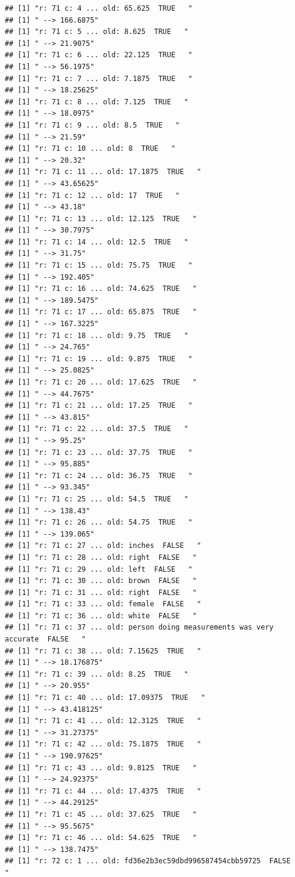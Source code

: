 \documentclass[]{article}
\begin{document}
\begin{verbatim}
## [1] "r: 71 c: 4 ... old: 65.625  TRUE   "
## [1] " --> 166.6875"
## [1] "r: 71 c: 5 ... old: 8.625  TRUE   "
## [1] " --> 21.9075"
## [1] "r: 71 c: 6 ... old: 22.125  TRUE   "
## [1] " --> 56.1975"
## [1] "r: 71 c: 7 ... old: 7.1875  TRUE   "
## [1] " --> 18.25625"
## [1] "r: 71 c: 8 ... old: 7.125  TRUE   "
## [1] " --> 18.0975"
## [1] "r: 71 c: 9 ... old: 8.5  TRUE   "
## [1] " --> 21.59"
## [1] "r: 71 c: 10 ... old: 8  TRUE   "
## [1] " --> 20.32"
## [1] "r: 71 c: 11 ... old: 17.1875  TRUE   "
## [1] " --> 43.65625"
## [1] "r: 71 c: 12 ... old: 17  TRUE   "
## [1] " --> 43.18"
## [1] "r: 71 c: 13 ... old: 12.125  TRUE   "
## [1] " --> 30.7975"
## [1] "r: 71 c: 14 ... old: 12.5  TRUE   "
## [1] " --> 31.75"
## [1] "r: 71 c: 15 ... old: 75.75  TRUE   "
## [1] " --> 192.405"
## [1] "r: 71 c: 16 ... old: 74.625  TRUE   "
## [1] " --> 189.5475"
## [1] "r: 71 c: 17 ... old: 65.875  TRUE   "
## [1] " --> 167.3225"
## [1] "r: 71 c: 18 ... old: 9.75  TRUE   "
## [1] " --> 24.765"
## [1] "r: 71 c: 19 ... old: 9.875  TRUE   "
## [1] " --> 25.0825"
## [1] "r: 71 c: 20 ... old: 17.625  TRUE   "
## [1] " --> 44.7675"
## [1] "r: 71 c: 21 ... old: 17.25  TRUE   "
## [1] " --> 43.815"
## [1] "r: 71 c: 22 ... old: 37.5  TRUE   "
## [1] " --> 95.25"
## [1] "r: 71 c: 23 ... old: 37.75  TRUE   "
## [1] " --> 95.885"
## [1] "r: 71 c: 24 ... old: 36.75  TRUE   "
## [1] " --> 93.345"
## [1] "r: 71 c: 25 ... old: 54.5  TRUE   "
## [1] " --> 138.43"
## [1] "r: 71 c: 26 ... old: 54.75  TRUE   "
## [1] " --> 139.065"
## [1] "r: 71 c: 27 ... old: inches  FALSE   "
## [1] "r: 71 c: 28 ... old: right  FALSE   "
## [1] "r: 71 c: 29 ... old: left  FALSE   "
## [1] "r: 71 c: 30 ... old: brown  FALSE   "
## [1] "r: 71 c: 31 ... old: right  FALSE   "
## [1] "r: 71 c: 33 ... old: female  FALSE   "
## [1] "r: 71 c: 36 ... old: white  FALSE   "
## [1] "r: 71 c: 37 ... old: person doing measurements was very accurate  FALSE   "
## [1] "r: 71 c: 38 ... old: 7.15625  TRUE   "
## [1] " --> 18.176875"
## [1] "r: 71 c: 39 ... old: 8.25  TRUE   "
## [1] " --> 20.955"
## [1] "r: 71 c: 40 ... old: 17.09375  TRUE   "
## [1] " --> 43.418125"
## [1] "r: 71 c: 41 ... old: 12.3125  TRUE   "
## [1] " --> 31.27375"
## [1] "r: 71 c: 42 ... old: 75.1875  TRUE   "
## [1] " --> 190.97625"
## [1] "r: 71 c: 43 ... old: 9.8125  TRUE   "
## [1] " --> 24.92375"
## [1] "r: 71 c: 44 ... old: 17.4375  TRUE   "
## [1] " --> 44.29125"
## [1] "r: 71 c: 45 ... old: 37.625  TRUE   "
## [1] " --> 95.5675"
## [1] "r: 71 c: 46 ... old: 54.625  TRUE   "
## [1] " --> 138.7475"
## [1] "r: 72 c: 1 ... old: fd36e2b3ec59dbd996587454cbb59725  FALSE   "

\end{verbatim}
\end{document}
